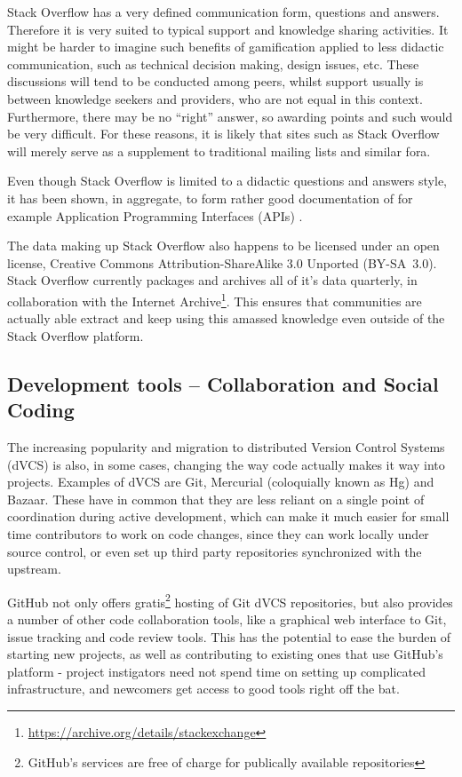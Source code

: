 \documentclass[a4paper,11pt]{article} %
\begin{document}
Stack Overflow has a very defined communication form, questions and
answers. Therefore it is very suited to typical support and knowledge
sharing activities. It might be harder to imagine such benefits of
gamification applied to less didactic communication, such as technical
decision making, design issues, etc. These discussions will tend to be
conducted among peers, whilst support usually is between knowledge
seekers and providers, who are not equal in this context. Furthermore,
there may be no ``right'' answer, so awarding points and such would be
very difficult. For these reasons, it is likely that sites such as
Stack Overflow will merely serve as a supplement to traditional
mailing lists and similar fora.

Even though Stack Overflow is limited to a didactic questions and answers
style, it has been shown, in aggregate, to form rather good documentation of
for example Application Programming Interfaces (APIs)
\cite{parnin2012crowd}.

The data making up Stack Overflow also happens to be licensed under an open
license, Creative Commons Attribution-ShareAlike 3.0 Unported \mbox{(BY-SA
3.0)}. Stack Overflow currently packages and archives all of it's data
quarterly, in collaboration with the Internet
Archive\footnote{\url{https://archive.org/details/stackexchange}}. This
ensures that communities are actually able extract and keep using this
amassed knowledge even outside of the Stack Overflow platform.


\subsection{Development tools -- Collaboration and Social Coding}

The increasing popularity and migration to distributed Version Control
Systems (dVCS) is also, in some cases, changing the way code actually makes
it way into projects. Examples of dVCS are Git, Mercurial (coloquially known
as Hg) and Bazaar. These have in common that they are less reliant on a
single point of coordination during active development, which can make it
much easier for small time contributors to work on code changes, since they
can work locally under source control, or even set up third party
repositories synchronized with the upstream.

GitHub not only offers gratis\footnote{GitHub's services are free of
  charge for publically available repositories} hosting of Git dVCS
repositories, but also provides a number of other code collaboration
tools, like a graphical web interface to Git, issue tracking and code
review tools. This has the potential to ease the burden of starting
new projects, as well as contributing to existing ones that use
GitHub's platform - project instigators need not spend time on setting
up complicated infrastructure, and newcomers get access to good tools
right off the bat.
\end{document}
